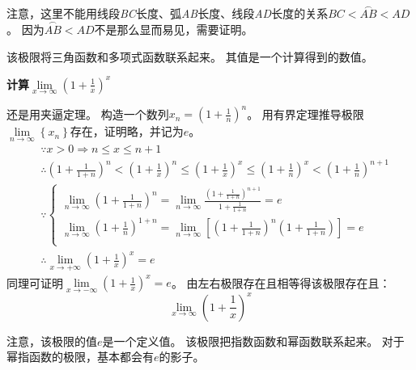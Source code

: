 注意，这里不能用线段{\it BC}长度、弧{\it AB}长度、线段{\it AD}长度的关系$BC<\overset\frown{AB}<AD$。
因为$\overset\frown{AB}<AD$不是那么显而易见，需要证明。

\begin{tcolorbox}
该极限将三角函数和多项式函数联系起来。
其值是一个计算得到的数值。
\end{tcolorbox}

{\bf 计算$\underset{x\rightarrow \infty}{\lim}\left( 1+\frac{1}{x} \right) ^x$}

还是用夹逼定理。
构造一个数列$x_n=\left( 1+\frac{1}{n} \right) ^n$。
用有界定理推导极限$\underset{n\rightarrow \infty}{\lim}\left\{ x_n \right\} $存在，证明略，并记为$e$。
\begin{align*}
&\because x>0\Rightarrow n\leqslant x\leqslant n+1 \\
&\therefore \left( 1+\frac{1}{1+n} \right) ^n<\left( 1+\frac{1}{x} \right) ^n\leqslant \left( 1+\frac{1}{x} \right) ^x\leqslant \left( 1+\frac{1}{n} \right) ^x<\left( 1+\frac{1}{n} \right) ^{n+1} \\
&\because \begin{cases}
	\underset{n\rightarrow \infty}{\lim}\left( 1+\frac{1}{1+n} \right) ^n=\underset{n\rightarrow \infty}{\lim}\frac{\left( 1+\frac{1}{1+n} \right) ^{n+1}}{1+\frac{1}{1+n}}=e\\
	\underset{n\rightarrow \infty}{\lim}\left( 1+\frac{1}{n} \right) ^{1+n}=\underset{n\rightarrow \infty}{\lim}\left[ \left( 1+\frac{1}{1+n} \right) ^n\left( 1+\frac{1}{1+n} \right) \right] =e\\
\end{cases} \\
&\therefore \underset{x\rightarrow +\infty}{\lim}\left( 1+\frac{1}{x} \right) ^x=e
\end{align*}
同理可证明$\underset{x\rightarrow -\infty}{\lim}\left( 1+\frac{1}{x} \right) ^x=e$。
由左右极限存在且相等得该极限存在且：
\[
\underset{x\rightarrow \infty}{\lim}\left( 1+\frac{1}{x} \right) ^x
\]

\begin{tcolorbox}
注意，该极限的值$e$是一个定义值。
该极限把指数函数和幂函数联系起来。
对于幂指函数的极限，基本都会有$e$的影子。
\end{tcolorbox}




